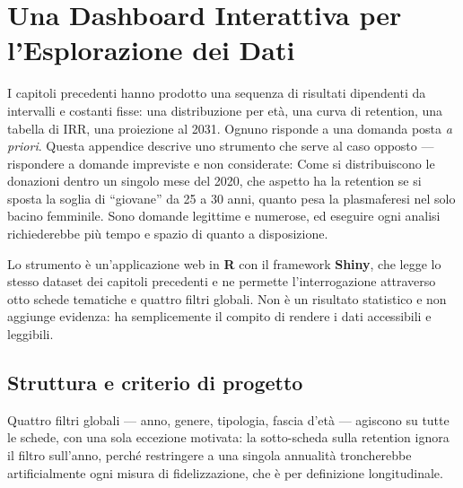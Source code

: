 
\chapter{Una Dashboard Interattiva per l'Esplorazione dei Dati}
\label{ch:dash}

I capitoli precedenti hanno prodotto una sequenza di risultati dipendenti da
intervalli e costanti fisse: una
distribuzione per età, una curva di retention, una tabella di IRR, una
proiezione al 2031. Ognuno risponde a una domanda posta \emph{a priori}.
Questa appendice descrive uno strumento che serve al caso opposto --- rispondere
a domande impreviste e non considerate: Come si
distribuiscono le donazioni dentro un singolo mese del 2020, che aspetto ha la
retention se si sposta la soglia di ``giovane'' da 25 a 30 anni, quanto pesa la
plasmaferesi nel solo bacino femminile. Sono domande legittime e numerose, ed
eseguire ogni analisi richiederebbe più tempo e spazio di quanto a disposizione.

Lo strumento è un'applicazione web in \textbf{R} con il framework
\textbf{Shiny}, che legge lo stesso dataset dei capitoli precedenti e ne
permette l'interrogazione attraverso otto schede tematiche e quattro filtri
globali. Non è un risultato statistico e non aggiunge evidenza: ha semplicemente
il compito di rendere i dati accessibili e leggibili.

\section{Struttura e criterio di progetto}
\label{sec:dash_ui}

Quattro filtri globali --- anno, genere, tipologia, fascia d'età --- agiscono su
tutte le schede, con una sola eccezione motivata: la sotto-scheda sulla
retention ignora il filtro sull'anno, perché restringere a una singola
annualità troncherebbe artificialmente ogni misura di fidelizzazione, che è per
definizione longitudinale.

